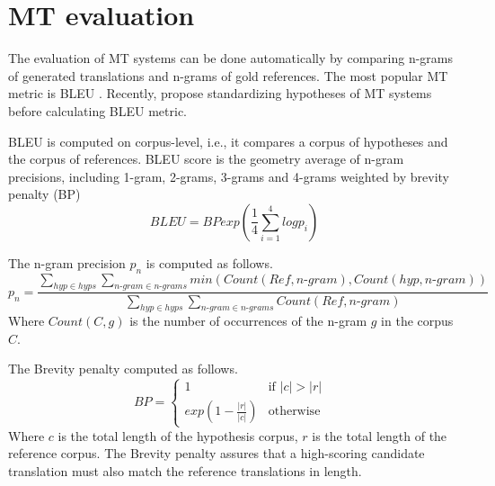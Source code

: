 \section{MT evaluation}
The evaluation of MT systems can be done automatically by comparing n-grams of generated translations and n-grams of gold references. The most popular MT metric is BLEU \citep{Papineni02bleu}. Recently, \citet{Post18A} propose standardizing hypotheses of MT systems before calculating BLEU metric. 

BLEU is computed on corpus-level, i.e., it compares a corpus of hypotheses and the corpus of references. BLEU score is the geometry average of n-gram precisions, including 1-gram, 2-grams, 3-grams and 4-grams weighted by brevity penalty (BP)
\begin{equation}
BLEU = BP exp(\frac{1}{4}\sum_{i=1}^4log p_i)
\end{equation}

The n-gram precision $p_n$ is computed as follows.
\begin{equation}
p_n = \frac{\sum_{hyp \in hyps}\sum_{n\text{-}gram \in n\text{-}grams} min(Count(Ref,n\text{-}gram), Count(hyp, n\text{-}gram))}{\sum_{hyp \in hyps}\sum_{n\text{-}gram \in n\text{-}grams} Count(Ref,n\text{-}gram)}
\end{equation}
Where $Count(C,g)$ is the number of occurrences of the n-gram $g$ in the corpus $C$.

The Brevity penalty computed as follows. 
\begin{equation}
  BP =
    \begin{cases}
      1 & \text{if $|c| > |r|$ }\\
      exp(1-\frac{|r|}{|c|}) & \text{otherwise}
    \end{cases}       
\end{equation}
Where $c$ is the total length of the hypothesis corpus, $r$ is the total length of the reference corpus. The Brevity penalty assures that a high-scoring candidate translation must also match the reference translations in length.







































